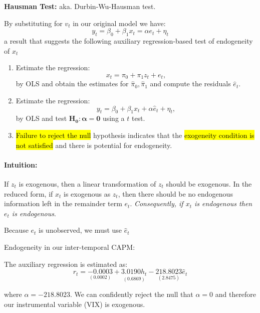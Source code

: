 \documentclass[11pt]{article}
\begin{document}
\begin{procedure}
\textbf{Hausman Test:} aka. Durbin-Wu-Hausman test.

By substituting for $v_t$ in our original model we have:
\[y_t = \beta_0 + \beta_1 x_t = \alpha e_t + \eta_t\]
a result that suggests the following auxiliary regression-based test of endogeneity of $x_t$

\begin{enumerate}
    \item Estimate the regression:
    \[x_t = \pi_0 + \pi_1 z_t + e_t,\]
    by OLS and obtain the estimates for $\hat{\pi}_0, \hat{\pi}_1$ and compute the residuals $\hat{e}_t$.

    \item Estimate the regression:
    \[y_t = \beta_0 + \beta_1 x_t + \alpha \hat{e}_t + \eta_t,\]
    by OLS and test $\boldsymbol{H_0: \alpha=0}$ using a $t$ test.

    \item \hl{Failure to reject the null} hypothesis indicates that the \hl{exogeneity condition is not satisfied} and there is potential for endogeneity.
\end{enumerate}
\end{procedure}

\begin{mdframed}
    \paragraph{Intuition:} \mbox{}

    If $z_t$ is exogenous, then a linear transformation of $z_t$ should be exogenous. In the reduced form, if $x_t$ is exogenous as $z_t$, then there should be no endogenous information left in the remainder term $e_t$. \textit{Consequently, if $x_t$ is endogenous then $e_t$ is endogenous}.

    \begin{note}
        Because $e_t$ is unobserved, we must use $\hat{e}_t$
    \end{note}
\end{mdframed}

\begin{example}
    Endogeneity in our inter-temporal CAPM:

    The auxiliary regression is estimated as:
    \begin{equation}
r_t=\underset{(0.0002)}{-0.0003}+\underset{(0.6869)}{3.0190 h_t}-\underset{(2.8475)}{218.8023} \hat{e}_t
\end{equation}

where $\alpha = -218.8023$. We can confidently reject the null that $\alpha=0$ and therefore our instrumental variable (VIX) is exogenous.
\end{example}
\end{document}
